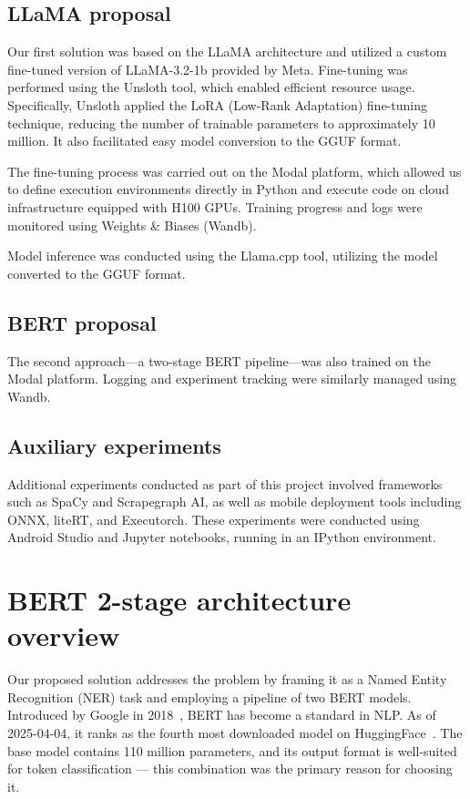 \documentclass[licencjacka,en]{pracamgr}
\begin{document}
\section{LLaMA proposal}

Our first solution was based on the LLaMA architecture and utilized a custom fine-tuned version of LLaMA-3.2-1b provided by Meta\cite{meta-llama}. Fine-tuning was performed using the Unsloth\cite{unsloth} tool, which enabled efficient resource usage. Specifically, Unsloth applied the LoRA (Low-Rank Adaptation) fine-tuning technique\cite{hu2021loralowrankadaptationlarge}, reducing the number of trainable parameters to approximately 10 million. It also facilitated easy model conversion to the GGUF format.

The fine-tuning process was carried out on the Modal platform\cite{modal}, which allowed us to define execution environments directly in Python and execute code on cloud infrastructure equipped with H100 GPUs. Training progress and logs were monitored using Weights \& Biases (Wandb)\cite{wandb}.

Model inference was conducted using the Llama.cpp\cite{llama-cpp} tool, utilizing the model converted to the GGUF format.

\section{BERT proposal}

The second approach—a two-stage BERT pipeline—was also trained on the Modal platform. Logging and experiment tracking were similarly managed using Wandb.

\section{Auxiliary experiments}

Additional experiments conducted as part of this project involved frameworks such as SpaCy\cite{spacy, spacy-exp} and Scrapegraph AI, as well as mobile deployment tools including ONNX\cite{onnx, onnx-exp}, liteRT\cite{lite-rt, lite-rt-exp}, and Executorch\cite{executorch, executorch-exp}. These experiments were conducted using Android Studio\cite{android-studio, service_demo_app_repo} and Jupyter notebooks\cite{jupyter}, running in an IPython\cite{ipython} environment.

\chapter{BERT 2-stage architecture overview} \label{chap:bert}
Our proposed solution addresses the problem by framing it as a Named Entity Recognition (NER) task and employing a pipeline of two BERT models. Introduced by Google in 2018~\cite{BERT_intro}, BERT has become a standard in NLP. As of 2025-04-04, it ranks as the fourth most downloaded model on HuggingFace~\cite{BERT_hf}. The base model contains 110 million parameters, and its output format is well-suited for token classification — this combination was the primary reason for choosing it.
\end{document}
